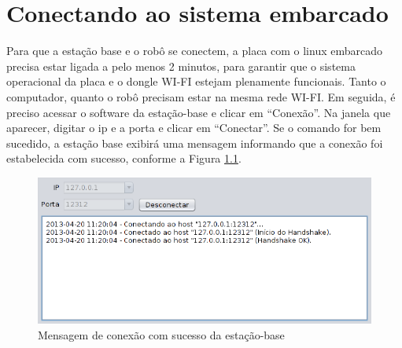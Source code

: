 \chapter{Conectando ao sistema embarcado}

Para que a estação base e o robô se conectem, a placa com o linux embarcado precisa estar ligada a pelo menos 2 minutos, para garantir que o sistema operacional da placa e o dongle WI-FI estejam plenamente funcionais. Tanto o computador, quanto o robô precisam estar na mesma rede WI-FI. Em seguida, é preciso acessar o software da estação-base e clicar em ``Conexão''. Na janela que aparecer, digitar o ip e a porta e clicar em ``Conectar''. Se o comando for bem sucedido, a estação base exibirá uma mensagem informando que a conexão foi estabelecida com sucesso, conforme a Figura \ref{fig:conectado}.


\begin{figure}[H]
\centering
\includegraphics[width=\textwidth]{./images/conectado.png}
\caption{Mensagem de conexão com sucesso da estação-base}
\label{fig:conectado}
\end{figure}

